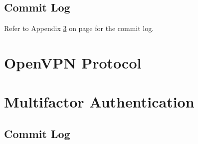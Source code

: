 \documentclass[11pt,oneside]{book}
\begin{document}
\section{Commit Log}
Refer to Appendix \ref{MFA:commit} on page \pageref{MFA:commit} for the commit log.

% 

\appendix
\chapter{OpenVPN Protocol}
\label{OpenVPN:protocol}


\chapter{Multifactor Authentication}
\label{MFA:commit}
\section{Commit Log}





\printindex
{}

\begin{verbatim}










\end{verbatim}
\end{document}

